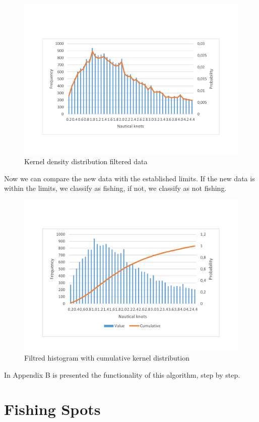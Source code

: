 \begin{figure}[H]
    \centering
    \includegraphics[trim=0 50 0 50,width=0.8\linewidth]{Chapters/img/hist_kernel.pdf}
    \caption{Kernel density distribution filtered data}
    \label{fig:hist_kernel}
\end{figure}


Now we can compare the new data with the established limits. If the new data is within the limits, we classify as fishing, if not, we classify as not fishing.

\begin{figure}[H]
    \centering
    \includegraphics[trim=0 50 0 50,width=0.8\linewidth]{Chapters/img/hist_comulative.pdf}
    \caption{Filtred histogram with cumulative kernel distribution}
    \label{fig:hist_comulative}
\end{figure}

In Appendix B is presented the functionality of this algorithm, step by step. 



\section{Fishing Spots} %
\label{sub:fishing_spots}

